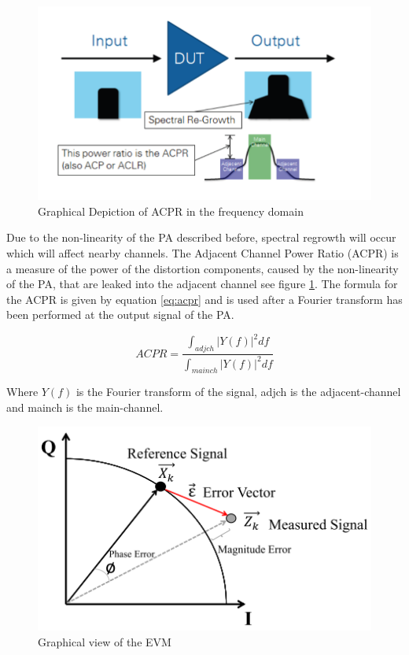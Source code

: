 \begin{figure}[H]
\centering 
\includegraphics[scale = 0.5]{figures/ch1/acpr.png}
\caption{Graphical Depiction of ACPR in the frequency domain \citep{NI}}
\label{fig:acpr}
\end{figure}

Due to the non-linearity of the PA described before, spectral regrowth will occur which will affect nearby channels. The Adjacent Channel Power Ratio (ACPR) is a measure of the power of the distortion components, caused by the non-linearity of the PA, that are leaked into the adjacent channel see figure \ref{fig:acpr}. The formula for the ACPR is given by equation \ref{eq:acpr} and is used after a Fourier transform has been performed at the output signal of the PA.

\begin{equation} \label{eq:acpr}
	ACPR = \frac{\int_{adjch}^{} |Y(f)|^2 df }{\int_{mainch}^{} |Y(f)|^2 df}
\end{equation}   

Where $Y(f)$ is the Fourier transform of the signal, adjch is the adjacent-channel and mainch is the main-channel. 

\begin{figure}[H]
\centering 
\includegraphics[scale = 0.8]{figures/ch1/evm.png}
\caption{Graphical view of the EVM}
\label{fig:evm}
\end{figure}
  
